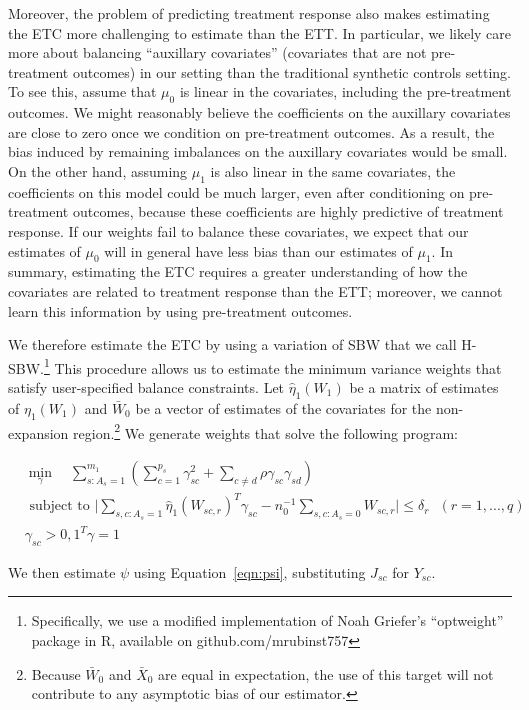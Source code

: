 \documentclass[aoas]{imsart}
\theoremstyle{plain}
\theoremstyle{remark}
\begin{document}
Moreover, the problem of predicting treatment response also makes estimating the ETC more challenging to estimate than the ETT. In particular, we likely care more about balancing ``auxillary covariates'' (covariates that are not pre-treatment outcomes) in our setting than the traditional synthetic controls setting. To see this, assume that $\mu_0$ is linear in the covariates, including the pre-treatment outcomes. We might reasonably believe the coefficients on the auxillary covariates are close to zero once we condition on pre-treatment outcomes. As a result, the bias induced by remaining imbalances on the auxillary covariates would be small. On the other hand, assuming $\mu_1$ is also linear in the same covariates, the coefficients on this model could be much larger, even after conditioning on pre-treatment outcomes, because these coefficients are highly predictive of treatment response. If our weights fail to balance these covariates, we expect that our estimates of $\mu_0$ will in general have less bias than our estimates of $\mu_1$. In summary, estimating the ETC requires a greater understanding of how the covariates are related to treatment response than the ETT; moreover, we cannot learn this information by using pre-treatment outcomes.

We therefore estimate the ETC by using a variation of SBW that we call H-SBW.\footnote{Specifically, we use a modified implementation of Noah Griefer's ``optweight'' package in R, available on github.com/mrubinst757} This procedure allows us to estimate the minimum variance weights that satisfy user-specified balance constraints. Let $\hat{\eta}_1(W_1)$ be a matrix of estimates of $\eta_1(W_1)$ and $\bar{W}_0$ be a vector of estimates of the covariates for the non-expansion region.\footnote{Because $\bar{W}_0$ and $\bar{X}_0$ are equal in expectation, the use of this target will not contribute to any asymptotic bias of our estimator.} We generate weights that solve the following program:

\begin{align*}
&\min_{\gamma} \quad \sum_{s: A_s = 1}^{m_1}(\sum_{c = 1}^{p_s} \gamma_{sc}^2 + \sum_{c \ne d}\rho \gamma_{sc}\gamma_{sd})\\
&\text{ subject to } \lvert \sum_{s,c: A_s = 1}\hat{\eta}_1(W_{sc, r})^T\gamma_{sc} - n_0^{-1}\sum_{s,c: A_s = 0} W_{sc, r} \lvert \le \delta_r  \ \ \ (r = 1, ..., q) \\
&\gamma_{sc} > 0, 1^T\gamma = 1
\end{align*}

We then estimate $\psi$ using Equation~\ref{eqn:psi}, substituting $J_{sc}$ for $Y_{sc}$.
\end{document}
